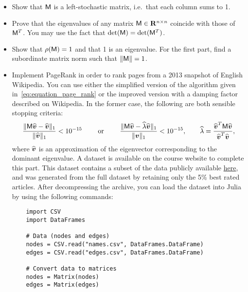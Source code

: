 \begin{exercise}
\begin{itemize}
        \item
            Show that $\mathsf M$ is a left-stochastic matrix,
            i.e.\ that each column sums to 1.

        \item
            Prove that the eigenvalues of any matrix $\mathsf M \in \mathbf R^{n \times n}$ coincide with those of $\mathsf M^T$.
            You may use the fact that $\det(\mathsf M) = \det(\mathsf M^T)$.

        \item
            Show that $\rho(\mathsf M) = 1$ and that 1 is an eigenvalue.
            For the first part, find a subordinate matrix norm such that $\lVert\mathsf M\rVert= 1$.

        \item
            Implement PageRank  in order to rank pages from a 2013 snapshot of English Wikipedia.
            You can use either the simplified version of the algorithm given in~\eqref{eq:equation_page_rank} or the improved version with a damping factor described on Wikipedia.
            In the former case,
            the following are both sensible stopping criteria:
            \[
                \frac{\lVert\mathsf M \widehat{\mathbf{\boldsymbol{v}}} - \widehat{\mathbf{\boldsymbol{v}}}\rVert_1}{\lVert\widehat{\mathbf{\boldsymbol{v}}}\rVert_1} < 10^{-15}
                \qquad \text{ or } \qquad
                \frac{\lVert\mathsf M \widehat{\mathbf{\boldsymbol{v}}} - \widehat \lambda \widehat{\mathbf{\boldsymbol{v}}}\rVert_1}{\lVert\mathbf{\boldsymbol{v}}\rVert_1} < 10^{-15},
                \qquad \widehat \lambda = \frac{\widehat{\mathbf{\boldsymbol{v}}}^T \mathsf M \widehat{\mathbf{\boldsymbol{v}}}}{\widehat{\mathbf{\boldsymbol{v}}}^T \widehat{\mathbf{\boldsymbol{v}}}},
            \]
            where $\widehat{\mathbf{\boldsymbol{v}}}$ is an approximation of the eigenvector corresponding to the dominant eigenvalue.
            A dataset is available on the course website to complete this part.
            This dataset contains a subset of the data publicly available \hyperlink{https://snap.stanford.edu/data/enwiki-2013.html}{here},
            and was generated from the full dataset by retaining only the 5\% best rated articles.
            After decompressing the archive,
            you can load the dataset into Julia by using the following commands:

            \begin{verbatim}
    import CSV
    import DataFrames

    # Data (nodes and edges)
    nodes = CSV.read("names.csv", DataFrames.DataFrame)
    edges = CSV.read("edges.csv", DataFrames.DataFrame)

    # Convert data to matrices
    nodes = Matrix(nodes)
    edges = Matrix(edges)
            \end{verbatim}


\end{itemize}
\end{exercise}
